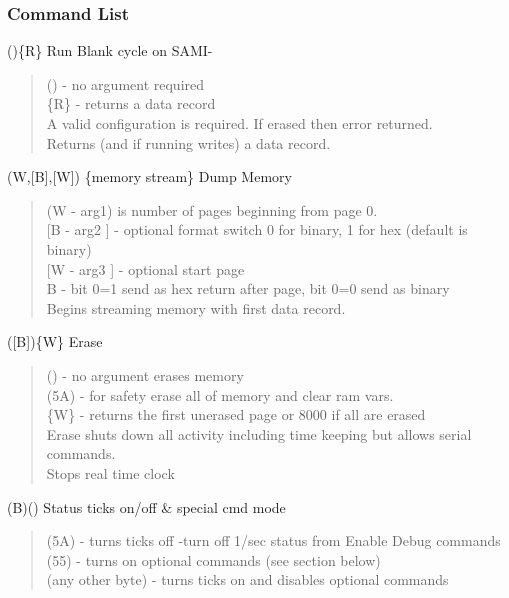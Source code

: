 \subsubsection*{Command List}

{ ()\{R\} Run Blank cycle on SAMI-\dioxide{}}
\begin{quote}
	() - no argument required\\
	\{R\} - returns a data record\\
	A valid configuration is required. If \instType{} erased then error returned.\\
	Returns (and if running writes) a data record.\\
\end{quote}

{ (W,{[}B{]},{[}W{]}) \{memory stream\} Dump Memory}
\begin{quote}
	(W - arg1) is number of pages beginning from page 0.\\
	{[}B - arg2 {]} - optional format switch 0 for binary, 1 for hex
	(default is binary)\\
	{[}W - arg3 {]} - optional start page\\
	B - bit 0=1 send as hex return after page, bit 0=0 send as binary\\
	Begins streaming memory with first data record.\\
\end{quote}

{ ({[}B{]})\{W\} Erase}
\begin{quote}
	() - no argument erases \instType{} memory\\
	(5A) - for safety erase all of memory and clear ram vars.\\
	\{W\} - returns the first unerased page or 8000 if all are erased\\
	Erase shuts down all activity including time keeping but allows serial
	commands.\\
	Stops real time clock\\
\end{quote}

{ (B)() Status ticks on/off \& special cmd mode}
\begin{quote}
	(5A) - turns ticks off -turn off 1/sec status from \instType{} Enable Debug
	commands\\
	(55) - turns on optional commands (see section below)\\
	(any other byte) - turns ticks on and disables optional commands\\
\end{quote}

